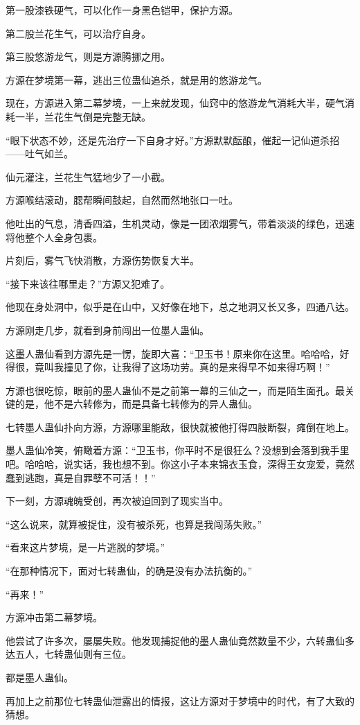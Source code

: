 \begin{this_body}
第一股漆铁硬气，可以化作一身黑色铠甲，保护方源。

第二股兰花生气，可以治疗自身。

第三股悠游龙气，则是方源腾挪之用。

方源在梦境第一幕，逃出三位蛊仙追杀，就是用的悠游龙气。

现在，方源进入第二幕梦境，一上来就发现，仙窍中的悠游龙气消耗大半，硬气消耗一半，兰花生气倒是完整无缺。

“眼下状态不妙，还是先治疗一下自身才好。”方源默默酝酿，催起一记仙道杀招——吐气如兰。

仙元灌注，兰花生气猛地少了一小截。

方源喉结滚动，腮帮瞬间鼓起，自然而然地张口一吐。

他吐出的气息，清香四溢，生机灵动，像是一团浓烟雾气，带着淡淡的绿色，迅速将他整个人全身包裹。

片刻后，雾气飞快消散，方源伤势恢复大半。

“接下来该往哪里走？”方源又犯难了。

他现在身处洞中，似乎是在山中，又好像在地下，总之地洞又长又多，四通八达。

方源刚走几步，就看到身前闯出一位墨人蛊仙。

这墨人蛊仙看到方源先是一愣，旋即大喜：“卫玉书！原来你在这里。哈哈哈，好得很，竟叫我撞见了你，让我得了这场功劳。真的是来得早不如来得巧啊！”

方源也很吃惊，眼前的墨人蛊仙不是之前第一幕的三仙之一，而是陌生面孔。最关键的是，他不是六转修为，而是具备七转修为的异人蛊仙。

七转墨人蛊仙扑向方源，方源哪里能敌，很快就被他打得四肢断裂，瘫倒在地上。

墨人蛊仙冷笑，俯瞰着方源：“卫玉书，你平时不是很狂么？没想到会落到我手里吧。哈哈哈，说实话，我也想不到。你这小子本来锦衣玉食，深得王女宠爱，竟然蠢到逃跑，真是自罪孽不可活！！”

下一刻，方源魂魄受创，再次被迫回到了现实当中。

“这么说来，就算被捉住，没有被杀死，也算是我闯荡失败。”

“看来这片梦境，是一片逃脱的梦境。”

“在那种情况下，面对七转蛊仙，的确是没有办法抗衡的。”

“再来！”

方源冲击第二幕梦境。

他尝试了许多次，屡屡失败。他发现捕捉他的墨人蛊仙竟然数量不少，六转蛊仙多达五人，七转蛊仙则有三位。

都是墨人蛊仙。

再加上之前那位七转蛊仙泄露出的情报，这让方源对于梦境中的时代，有了大致的猜想。


\end{this_body}
